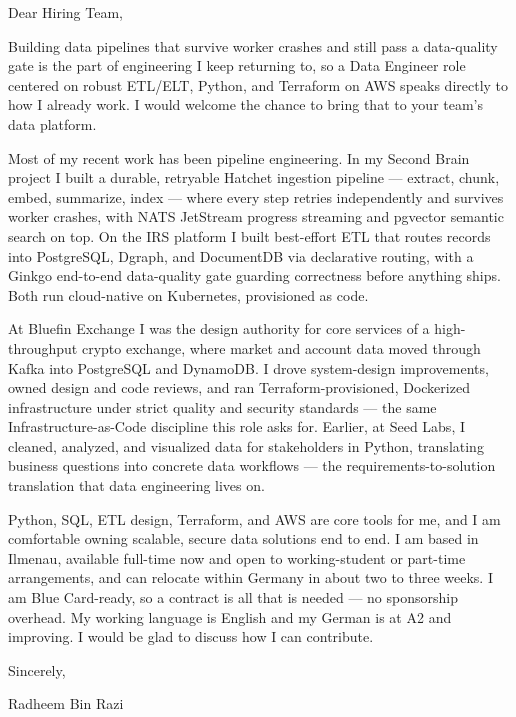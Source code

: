 \documentclass[11pt,a4paper]{coverletter}
\begin{document}

\opening{Dear Hiring Team,}

Building data pipelines that survive worker crashes and still pass a data-quality gate is the part of engineering I keep returning to, so a Data Engineer role centered on robust ETL/ELT, Python, and Terraform on AWS speaks directly to how I already work. I would welcome the chance to bring that to your team's data platform.

Most of my recent work has been pipeline engineering. In my Second Brain project I built a durable, retryable Hatchet ingestion pipeline — extract, chunk, embed, summarize, index — where every step retries independently and survives worker crashes, with NATS JetStream progress streaming and pgvector semantic search on top. On the IRS platform I built best-effort ETL that routes records into PostgreSQL, Dgraph, and DocumentDB via declarative routing, with a Ginkgo end-to-end data-quality gate guarding correctness before anything ships. Both run cloud-native on Kubernetes, provisioned as code.

At Bluefin Exchange I was the design authority for core services of a high-throughput crypto exchange, where market and account data moved through Kafka into PostgreSQL and DynamoDB. I drove system-design improvements, owned design and code reviews, and ran Terraform-provisioned, Dockerized infrastructure under strict quality and security standards — the same Infrastructure-as-Code discipline this role asks for. Earlier, at Seed Labs, I cleaned, analyzed, and visualized data for stakeholders in Python, translating business questions into concrete data workflows — the requirements-to-solution translation that data engineering lives on.

Python, SQL, ETL design, Terraform, and AWS are core tools for me, and I am comfortable owning scalable, secure data solutions end to end. I am based in Ilmenau, available full-time now and open to working-student or part-time arrangements, and can relocate within Germany in about two to three weeks. I am Blue Card-ready, so a contract is all that is needed — no sponsorship overhead. My working language is English and my German is at A2 and improving. I would be glad to discuss how I can contribute.

\closing{Sincerely,}{Radheem Bin Razi}

\clearpage
{}

\end{document}
